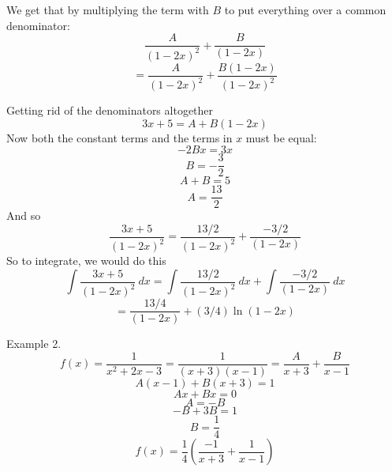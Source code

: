 \documentclass[11pt, oneside]{article}   	%
\begin{document}
We get that by multiplying the term with $B$ to put everything over a common denominator:
\[ \frac{A}{(1-2x)^2} + \frac{B}{(1-2x)} \]
\[ = \frac{A}{(1-2x)^2} + \frac{B(1-2x)}{(1-2x)^2}\]

Getting rid of the denominators altogether
\[ 3x + 5 = A + B(1-2x) \]
Now both the constant terms and the terms in $x$ must be equal:
\[ -2Bx = 3x \]
\[ B = -\frac{3}{2} \]
\[ A + B = 5 \]
\[ A = \frac{13}{2} \]
And so
\[ \frac{3x+5}{(1-2x)^2} = \frac{13/2}{(1-2x)^2} + \frac{-3/2}{(1-2x)} \]
So to integrate, we would do this
\[ \int \frac{3x+5}{(1-2x)^2} \ dx = \int \frac{13/2}{(1-2x)^2} \ dx + \int \frac{-3/2}{(1-2x)}  \ dx \]
\[ = \frac{13/4}{(1-2x)} +(3/4) \ln (1-2x) \]

Example 2.
\[ f(x) = \frac{1}{x^2 + 2x - 3} = \frac{1}{(x+3)(x-1)} = \frac{A}{x+3} + \frac{B}{x-1} \]
\[ A(x-1) + B(x+3) = 1 \]
\[ Ax + Bx = 0 \]
\[ A = -B \]
\[ -B + 3B = 1 \]
\[ B = \frac{1}{4} \]
\[ f(x) = \frac{1}{4}( \frac{-1}{x+3} + \frac{1}{x-1} )\]
\end{document}
